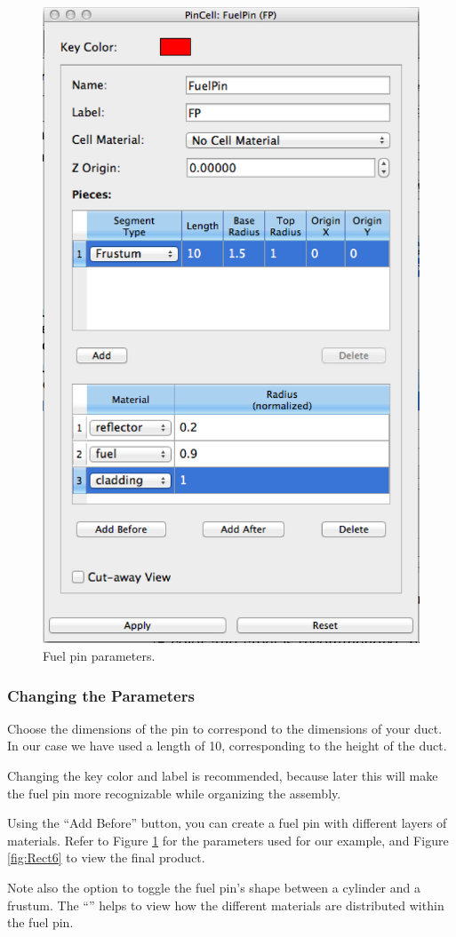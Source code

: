 \begin{figure}
\begin{minipage}{.4\textwidth}
  \centering
	\includegraphics[width=0.65\linewidth]{Images/rect-pin-params.png}
	\caption{Fuel pin parameters.}
	\label{fig:Rect5}
\end{minipage}
\end{figure}

\subsubsection{Changing the Parameters}

Choose the dimensions of the pin to correspond to the dimensions of your duct.  In our case we have used a length of 10, corresponding to the height of the duct.


Changing the key color and label is recommended, because later this will make the fuel pin more recognizable while organizing the assembly.


Using the ``Add Before'' button, you can create a fuel pin with different layers of materials.  Refer to Figure \ref{fig:Rect5} for the parameters used for our example, and Figure \ref{fig:Rect6} to view the final product.

Note also the option to toggle the fuel pin's shape between a cylinder and a frustum.  The ``'' helps to view how the different materials are distributed within the fuel pin.

